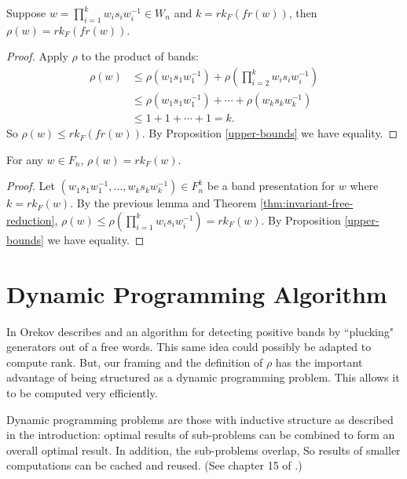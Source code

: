 \documentclass[12pt]{thesis}
\begin{document}
\begin{lemma}
    Suppose $w = \prod_{i=1}^{k} w_{i}s_{i}w_{i}^{-1} \in W_{n}$
    and $k = rk_{F}(fr(w))$,
    then $\rho(w) = rk_{F}(fr(w))$.
\end{lemma}

\begin{proof}
   Apply $\rho$ to the product of bands:
\[
\begin{split}
    \rho(w) &\leq \rho(w_{1}s_{1}w_{1}^{-1}) + \rho(\prod_{i=2}^{k} w_{i}s_{i}w_{i}^{-1}) \\
    &\leq \rho(w_{1}s_{1}w_{1}^{-1}) + \cdots + \rho(w_{k}s_{k}w_{k}^{-1}) \\
    &\leq 1 + 1 + \cdots + 1 = k.
\end{split}
\]
    So $\rho(w) \leq rk_{F}(fr(w))$.
    By Proposition \ref{upper-bounds} we have equality.
\end{proof}

\begin{corollary}
    For any $w \in F_{n}$,
    $\rho(w) = rk_{F}(w)$. 
\end{corollary}

\begin{proof}
    Let $(w_{1}s_{1}w_{1}^{-1}, \ldots, w_{k}s_{k}w_{k}^{-1}) \in F_{n}^{k}$
    be a band presentation for $w$ where $k = rk_{F}(w)$.
    By the previous lemma and Theorem \ref{thm:invariant-free-reduction},
    $\rho(w) \leq \rho(\prod_{i=1}^{k} w_{i}s_{i}w_{i}^{-1}) = rk_{F}(w)$.
    By Proposition \ref{upper-bounds} we have equality.
\end{proof}

\section{Dynamic Programming Algorithm}

In \cite{quasipositive-3-braids} Orekov describes and an algorithm
for detecting positive bands by ``plucking" generators out of a free words.
This same idea could possibly be adapted to compute rank.
But, our framing and the definition of $\rho$ has the important advantage of being structured as a dynamic programming problem.
This allows it to be computed very efficiently.

Dynamic programming problems are those with inductive structure
as described in the introduction:
optimal results of sub-problems can be combined to form
an overall optimal result. In addition, the sub-problems overlap,
So results of smaller computations can be cached and reused.
(See chapter 15 of \cite{clrs}.)
\end{document}
